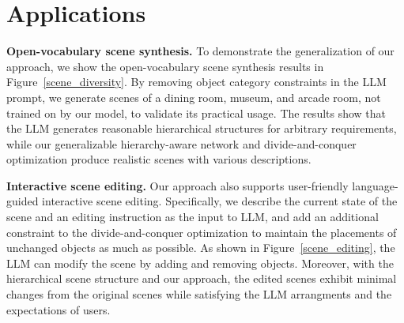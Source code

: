 


\section{Applications}

\noindent\textbf{Open-vocabulary scene synthesis.} To demonstrate the generalization of our approach, we show the open-vocabulary scene synthesis results in Figure~\ref{scene_diversity}. By removing object category constraints in the LLM prompt, we generate scenes of a dining room, museum, and arcade room, not trained on by our model, to validate its practical usage. The results show that the LLM generates reasonable hierarchical structures for arbitrary requirements, while our generalizable hierarchy-aware network and divide-and-conquer optimization produce realistic scenes with various descriptions.



\noindent\textbf{Interactive scene editing.} Our approach also supports user-friendly language-guided interactive scene editing. Specifically, we describe the current state of the scene and an editing instruction as the input to LLM, and add an additional constraint to the divide-and-conquer optimization to maintain the placements of unchanged objects as much as possible. As shown in Figure~\ref{scene_editing}, the LLM can modify the scene by adding and removing objects. Moreover, with the hierarchical scene structure and our approach, the edited scenes exhibit minimal changes from the original scenes while satisfying the LLM arrangments and the expectations of users.